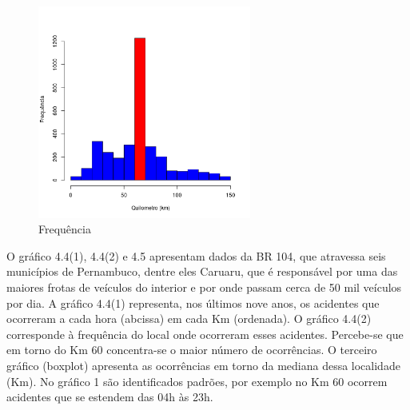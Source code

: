 \quad \quad
\begin{figure}[h]
	\centering
	\caption{ Frequência}
	\includegraphics[width=7cm,height=7cm]{Figuras/Preprocess/br104_3.png}
\end{figure}

O gráfico 4.4(1), 4.4(2) e 4.5 apresentam dados da BR 104, que atravessa seis municípios de Pernambuco, dentre eles Caruaru, que é responsável por uma das maiores frotas de veículos do interior e por onde passam cerca de 50 mil veículos por dia. 
A gráfico 4.4(1) representa, nos últimos nove anos, os acidentes que ocorreram a cada hora (abcissa) em cada Km (ordenada).
O  gráfico 4.4(2) corresponde à frequência do local onde ocorreram esses acidentes. 
Percebe-se que em torno do Km 60 concentra-se o maior número de ocorrências. 
O terceiro gráfico (boxplot) apresenta as ocorrências em torno da mediana dessa localidade (Km). 
No gráfico 1 são identificados padrões, por exemplo no Km 60 ocorrem acidentes que se estendem das 04h às 23h. 



